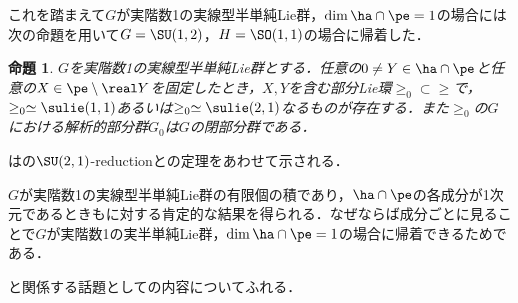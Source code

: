 \documentclass[12pt,dvipdfmx,uplatex]{jsarticle}
\newcounter{countabst}
\newtheorem{prop-a}[countabst]{命題}
\begin{document}
これを踏まえて$G$が実階数1の実線型半単純Lie群，$\dim \ha\cap\pe =1 $の場合には次の命題を用いて$G = \SU(1,2) $，$H= \SO(1,1)$の場合に帰着した．

\begin{prop-a}\label{prop:reduction}
  $G$を実階数1の実線型半単純Lie群とする．任意の$0\neq Y\in \ha\cap\pe $と任意の$X\in \pe\setminus \real Y$を固定したとき，$X,Y$を含む部分Lie環$\ge_0\subset \ge$で，$\ge_0\simeq \sulie(1,1) $あるいは$\ge_0\simeq \sulie(2,1)$なるものが存在する．また$\ge_0$の$G$における解析的部分群$G_0$は$G$の閉部分群である．
\end{prop-a}
\vspace{-0.5em}
は\cite[p.~409]{hel01}の{$\SU(2,1) $-reduction}と\cite{yos38}の定理をあわせて示される．

$G$が実階数1の実線型半単純Lie群の有限個の積であり，$\ha\cap \pe $の各成分が1次元であるときもに対する肯定的な結果を得られる．なぜならば成分ごとに見ることで$G$が実階数1の実半単純Lie群，$\dim \ha\cap\pe =1 $の場合に帰着できるためである．

と関係する話題として\cite{ber88}の内容についてふれる．
\end{document}
